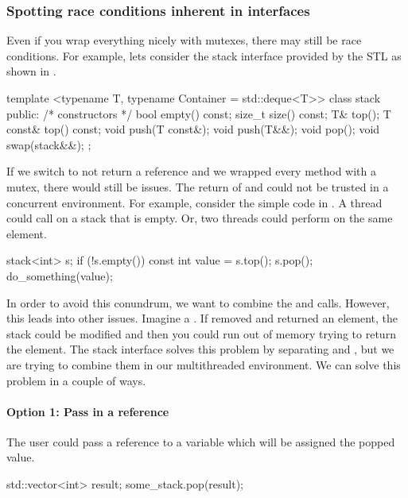 \subsubsection{Spotting race conditions inherent in interfaces}
Even if you wrap everything nicely with mutexes, there may still be race conditions. For example, lets consider the stack interface provided by the STL as shown in .

\begin{CPP}[label=list:stack-interface,caption=The interface to the \cpp{std::stack} container adapter]
template <typename T, typename Container = std::deque<T>>
class stack {
public:
    /* constructors */
    bool empty() const;
    size_t size() const;
    T& top();
    T const& top() const;
    void push(T const&);
    void push(T&&);
    void pop();
    void swap(stack&&);
};
\end{CPP}

If we switch  to not return a reference and we wrapped every method with a mutex, there would still be issues. The return of  and  could not be trusted in a concurrent environment. For example, consider the simple code in . A thread could call  on a stack that is empty. Or, two threads could perform  on the same element.

\begin{CPP}[label=list:stack-interface-oops,caption=The problem with the standard stack interface]
stack<int> s;
if (!s.empty()) {
    const int value = s.top();
    s.pop();
    do_something(value);
}
\end{CPP}

In order to avoid this conundrum, we want to combine the  and  calls. However, this leads into other issues. Imagine a . If  removed and returned an element, the stack could be modified and then you could run out of memory trying to return the element. The stack interface solves this problem by separating  and , but we are trying to combine them in our multithreaded environment. We can solve this problem in a couple of ways.

\paragraph{Option 1: Pass in a reference}
The user could pass a reference to a variable which will be assigned the popped value.
\begin{CPP}
std::vector<int> result;
some_stack.pop(result);
\end{CPP}

